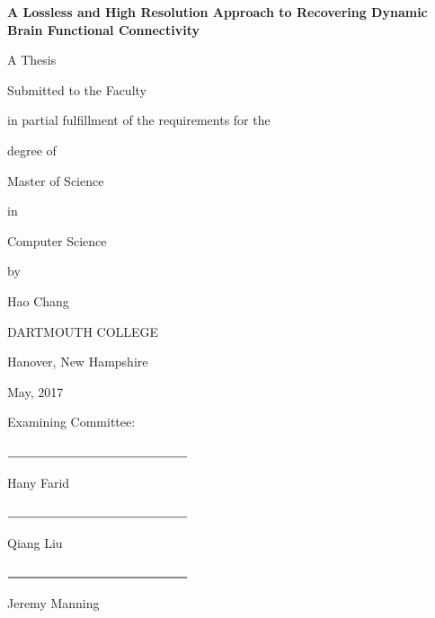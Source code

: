 \documentclass[11pt]{article}
\begin{document}
{\centering
  \textbf{A Lossless and High Resolution Approach to Recovering Dynamic Brain Functional Connectivity}\par
  A Thesis\par
  Submitted to the Faculty\par
  in partial fulfillment of the requirements for the\par
  degree of\par
  Master of Science\par
  in\par
  Computer Science\par
  by\par
  Hao Chang\par
  DARTMOUTH COLLEGE\par
  Hanover, New Hampshire\par
  May, 2017\par
}
\vspace{5mm}
\setlength{\parskip}{0em}
\begin{flushright}
Examining Committee:\par
\vspace{5mm}
$\rule{5cm}{0.15mm}$\par
Hany Farid\par
\vspace{5mm}
$\rule{5cm}{0.15mm}$\par
Qiang Liu\par
\vspace{5mm}
$\rule{5cm}{0.25mm}$\par
Jeremy Manning\par
\end{flushright}
\setlength{\parskip}{1em}
\newpage


\null\par
\newpage
{}
\end{document}
